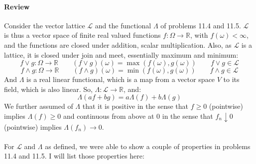 \documentclass[12pt,a4paper]{article}
\newcommand{\1}[1]{\mathbbm{1}\left\{ #1 \right\}}
\newcommand{\R}{\mathbb{R}}
\newcommand{\lcal}{\mathcal{L}}
\begin{document}
\paragraph{Review} Consider the vector lattice $\lcal$ and the functional $\Lambda$ of problems 11.4 and 11.5. $\lcal$ is thus a vector space of finite real valued functions $f: \Omega \to \R$, with $f(\omega) < \infty$, and the functions are closed under addition, scalar multiplication. Also, as $\lcal$ is a lattice, it is closed under join and meet, essentially maximum and minimum:
$$
	f \vee g: \Omega \to \R \quad\quad
	(f \vee g)(\omega) = \max(f(\omega), g(\omega)) \quad\quad
	f \vee g \in \lcal
$$
$$
	f \wedge g: \Omega \to \R \quad\quad
	(f \wedge g)(\omega) = \min(f(\omega), g(\omega)) \quad\quad
	f \wedge g \in \lcal
$$
And $\Lambda$ is a real linear functional, which is a map from a vector space $V$ to its field, which is also linear. So, $\Lambda: \lcal \to \R$, and:
$$
	\Lambda(af + bg) = a\Lambda(f) + b\Lambda(g)
$$
We further assumed of $\Lambda$ that it is positive in the sense that $f \geq 0$ (pointwise) implies $\Lambda(f) \geq 0$ and continuous from above at $0$ in the sense that $f_n \downarrow 0$ (pointwise) implies $\Lambda(f_n) \to 0$.
\\\\
For $\lcal$ and $\Lambda$ as defined, we were able to show a couple of properties in problems 11.4 and 11.5. I will list those properties here:
\end{document}
